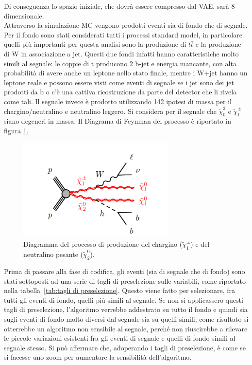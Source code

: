 Di conseguenza lo spazio iniziale, che dovrà essere compresso dal VAE, sarà 8-dimensionale. \\
Attraverso la simulazione MC vengono prodotti eventi sia di fondo che di segnale. Per il fondo sono stati considerati tutti i processi standard model, in particolare quelli più importanti per questa analisi sono la produzione di $t\bar{t}$ e la produzione di W in associazione a jet. Questi due fondi infatti hanno caratteristiche molto simili al segnale: le coppie di t producono 2 b-jet e energia mancante, con alta probabilità di avere anche un leptone nello stato finale, mentre i W+jet hanno un leptone reale e possono essere visti come eventi di segnale se i jet sono dei jet prodotti da b o c'è una cattiva ricostruzione da parte del detector che li rivela come tali. Il segnale invece è prodotto utilizzando 142 ipotesi di massa per il chargino/neutralino e neutralino leggero. Si considera per il segnale che $\tilde{\chi}^2_0$ e $\tilde{\chi}_1^\pm$ siano degeneri in massa. Il Diagrama di Feynman del processo è riportato in figura \ref{diagrammaF}.
\begin{figure}[h!]
	\centering
	\includegraphics[width=0.70\textwidth]{figs/diagrammaF.png}
	\caption{Diagramma del processo di produzione del chargino ($\tilde{\chi}_1^\pm$) e del neutralino pesante ($\tilde{\chi}_2^0$).}
	\label{diagrammaF}
\end{figure}

Prima di passare alla fase di codifica, gli eventi (sia di segnale che di fondo) sono stati sottoposti ad una serie di tagli di preselezione sulle variabili, come riportato nella tabella~\ref{tab:tagli di preselezione}. Questo viene fatto per selezionare, fra tutti gli eventi di fondo, quelli più simili al segnale. Se non si applicassero questi tagli di preselezione, l'algoritmo verrebbe addestrato su tutto il fondo e quindi sia sugli eventi di fondo molto diversi dal segnale sia su quelli simili; come risultato si otterrebbe un algoritmo non sensibile al segnale, perché non riuscirebbe a rilevare le piccole variazioni esistenti fra gli eventi di segnale e quelli di fondo simili al segnale stesso. Si può affermare che, adoperando i tagli di preselezione, è come se si facesse uno zoom per aumentare la sensibilità dell'algoritmo. 

